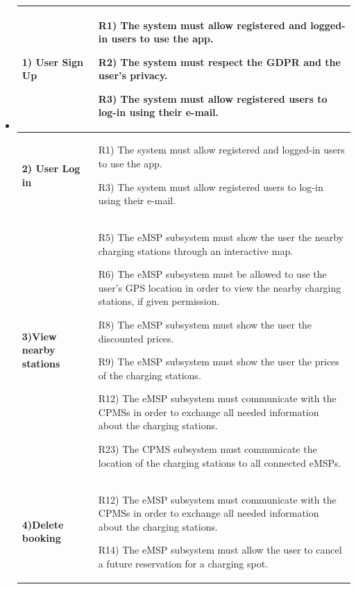 \documentclass[table, 12pt]{article} %
\begin{document}
\begin{itemize}
    
        \item[] \begin{longtable}{|p{}|p{}|}
                    \hline
                    \cellcolor{SpringGreen!50}\textbf{1) User Sign Up}\centering & 
                    R1) The system must allow registered and logged-in users to use the app.

                    R2) The system must respect the GDPR and the user's privacy.

                    R3) The system must allow registered users to log-in using their e-mail.
                    \\\hline

                    \cellcolor{SpringGreen!50}\textbf{2) User Log in}\centering & 
                    R1) The system must allow registered and logged-in users to use the app.

                    R3) The system must allow registered users to log-in using their e-mail.
                    \\\hline

                    \cellcolor{SpringGreen!50}\textbf{3)View nearby stations}\centering & 
                    R5) The eMSP subsystem must show the user the nearby charging stations through an interactive map.

                    R6) The eMSP subsystem must be allowed to use the user's GPS location in order to view the nearby charging stations, if given permission.

                    R8) The eMSP subsystem must show the user the discounted prices.

                    R9) The eMSP subsystem must show the user the prices of the charging stations.

                    R12) The eMSP subsystem must communicate with the CPMSs in order to exchange all needed information about the charging stations.

                    R23) The CPMS subsystem must communicate the location of the charging stations to all connected eMSPs.
                    \\\hline


                    \cellcolor{SpringGreen!50}\textbf{4)Delete booking}\centering & 
                    R12) The eMSP subsystem must communicate with the CPMSs in order to exchange all needed information about the charging stations.

                    R14) The eMSP subsystem must allow the user to cancel a future reservation for a charging spot.


\end{longtable}
\end{itemize}
\end{document}
